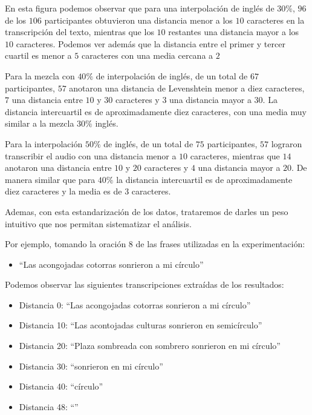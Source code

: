 En esta figura podemos observar que para una interpolación de inglés de $30\%$, $96$ de los $106$ participantes obtuvieron una distancia menor a los $10$ caracteres en la transcripción del texto, mientras que los $10$ restantes una distancia mayor a los $10$ caracteres. Podemos ver además que la distancia entre el primer y tercer cuartil es menor a $5$ caracteres con una media cercana a $2$ 

Para la mezcla con $40\%$ de interpolación de inglés, de un total de $67$ participantes, $57$ anotaron una distancia de Levenshtein menor a diez caracteres, $7$ una distancia entre $10$ y $30$ caracteres y $3$ una distancia mayor a $30$. La distancia intercuartil es de aproximadamente diez caracteres, con una media muy similar a la mezcla $30\%$ inglés.

Para la interpolación $50\%$ de inglés, de un total de $75$ participantes, $57$ lograron transcribir el audio con una distancia menor a $10$ caracteres, mientras que $14$ anotaron una distancia entre $10$ y $20$ caracteres y $4$ una distancia mayor a $20$. De manera similar que para $40\%$ la distancia intercuartil es de aproximadamente diez caracteres y la media es de $3$ caracteres.

Ademas, con esta estandarización de los datos, trataremos de darles un peso intuitivo que nos permitan sistematizar el análisis.

Por ejemplo, tomando la oración $8$ de las frases utilizadas en la experimentación: 

\begin{itemize}
	\item ``Las acongojadas cotorras sonrieron a mi círculo''
\end{itemize}

Podemos observar las siguientes transcripciones extraídas de los resultados:

\begin{itemize}
	\item Distancia 0: ``Las acongojadas cotorras sonrieron a mi círculo''
	\item Distancia 10: ``Las acontojadas culturas sonrieron en semicírculo''
	\item Distancia 20: ``Plaza sombreada con sombrero sonrieron en mi círculo''
	\item Distancia 30: ``sonrieron en mi círculo''
	\item Distancia 40: ``círculo''
	\item Distancia 48: ``''
\end{itemize}

